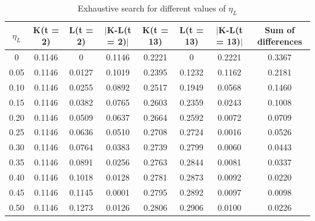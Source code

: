 \documentclass[a4paper]{article}
\begin{document}
\begin{table}[!htpb]
\centering
\begin{adjustbox}{width=1.2\textwidth,center=\textwidth}
\begin{tabular}{c|c|c|c|c|c|c|c}
\textbf{$\eta_{L}$} & \textbf{K(t = 2)} & \textbf{L(t = 2)} & \textbf{$|$K-L(t = 2)$|$} & \textbf{K(t = 13)} & \textbf{L(t = 13)} & \textbf{$|$K-L(t = 13)$|$} & \textbf{Sum of differences} \\ \hline
0                   & 0.1146            & 0                 & 0.1146                    & 0.2221             & 0                  & 0.2221                     & 0.3367                      \\
0.05                & 0.1146            & 0.0127            & 0.1019                    & 0.2395             & 0.1232             & 0.1162                     & 0.2181                      \\
0.10                & 0.1146            & 0.0255            & 0.0892                    & 0.2517             & 0.1949             & 0.0568                     & 0.1460                      \\
0.15                & 0.1146            & 0.0382            & 0.0765                    & 0.2603             & 0.2359             & 0.0243                     & 0.1008                      \\
0.20                & 0.1146            & 0.0509            & 0.0637                    & 0.2664             & 0.2592             & 0.0072                     & 0.0709                      \\
0.25                & 0.1146            & 0.0636            & 0.0510                    & 0.2708             & 0.2724             & 0.0016                     & 0.0526                      \\
0.30                & 0.1146            & 0.0764            & 0.0383                    & 0.2739             & 0.2799             & 0.0060                     & 0.0443                      \\
0.35                & 0.1146            & 0.0891            & 0.0256                    & 0.2763             & 0.2844             & 0.0081                     & 0.0337                      \\
0.40                & 0.1146            & 0.1018            & 0.0128                    & 0.2781             & 0.2873             & 0.0092                     & 0.0220                      \\
0.45                & 0.1146            & 0.1145            & 0.0001                    & 0.2795             & 0.2892             & 0.0097                     & 0.0098                      \\
0.50                & 0.1146            & 0.1273            & 0.0126                    & 0.2806             & 0.2906             & 0.0100                     & 0.0226                     
\end{tabular}
\end{adjustbox}
\caption{Exhaustive search for different values of $\eta_{L}$}
\label{tab:exaustive_search}
\end{table}
\end{document}
